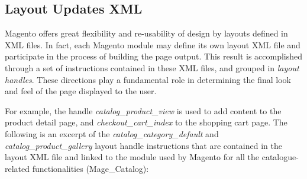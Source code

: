 \subsection{Layout Updates XML}

Magento offers great flexibility and re-usability of design by layouts defined in XML files. In fact, each Magento module may define its own layout XML file and participate in the process of building the page output. This result is accomplished through a set of instructions contained in these XML files, and grouped in \textit{layout handles}. These directions play a fundamental role in determining the final look and feel of the page displayed to the user.

For example, the handle \textit{catalog\_product\_view} is used to add content to the product detail page, and \textit{checkout\_cart\_index} to the shopping cart page. The following is an excerpt of the \textit{catalog\_category\_default} and \textit{catalog\_product\_gallery} layout handle instructions that are contained in the layout XML file and linked to the module used by Magento for all the catalogue-related functionalities (Mage\_Catalog):


